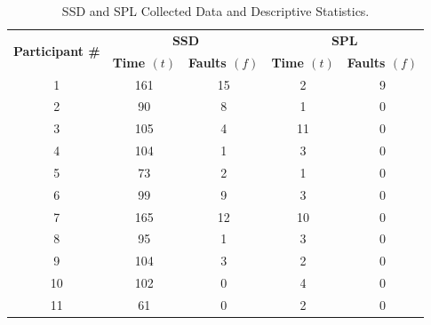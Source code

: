\begin{table}[!ht]
\caption{\label{tab:resul1}SSD and SPL Collected Data and Descriptive Statistics.}
    \centering
    \scriptsize
\begin{tabular}{c|c|c|c|c}
\hline
\multirow{2}{*}{\textbf{Participant \#}} & \multicolumn{2}{c|}{\textbf{SSD}} & \multicolumn{2}{c}{\textbf{SPL}}  \\ \cline{2-5}
                                    & \textbf{Time $(t)$}   & \textbf{Faults $(f)$} & \textbf{Time $(t)$}  & \textbf{Faults $(f)$}                                  \\ \hline
1                                   & 161             & 15              & 2              & 9                                              \\ \hline
2                                   & 90              & 8               & 1              & 0                                             \\ \hline
3                                   & 105             & 4               & 11             & 0                                              \\ \hline
4                                   & 104             & 1               & 3              & 0                                             \\ \hline
5                                   & 73              & 2               & 1              & 0                                             \\ \hline
6                                   & 99              & 9               & 3              & 0                                              \\ \hline
7                                   & 165             & 12              & 10             & 0                                              \\ \hline
8                                   & 95              & 1               & 3              & 0                                              \\ \hline
9                                   & 104             & 3               & 2              & 0                                               \\ \hline
10                                  & 102             & 0               & 4              & 0                                              \\ \hline
11                                  & 61              & 0               & 2              & 0                                             \\ \hline

\end{tabular}
\end{table}

